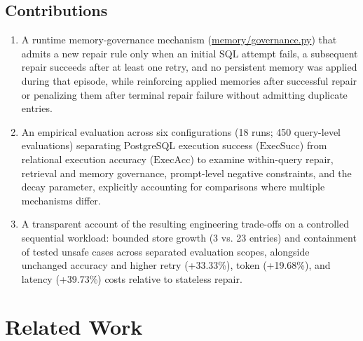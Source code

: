 \subsection{Contributions}
\begin{enumerate}
\item A runtime memory-governance mechanism (\url{memory/governance.py}) that admits a new repair rule only when an initial SQL attempt fails, a subsequent repair succeeds after at least one retry, and no persistent memory was applied during that episode, while reinforcing applied memories after successful repair or penalizing them after terminal repair failure without admitting duplicate entries.
\item An empirical evaluation across six configurations (18 runs; 450 query-level evaluations) separating PostgreSQL execution success ($\text{ExecSucc}$) from relational execution accuracy ($\text{ExecAcc}$) to examine within-query repair, retrieval and memory governance, prompt-level negative constraints, and the decay parameter, explicitly accounting for comparisons where multiple mechanisms differ.
\item A transparent account of the resulting engineering trade-offs on a controlled sequential workload: bounded store growth (3 vs. 23 entries) and containment of tested unsafe cases across separated evaluation scopes, alongside unchanged accuracy and higher retry (+33.33\%), token (+19.68\%), and latency (+39.73\%) costs relative to stateless repair.
\end{enumerate}

\section{Related Work}

